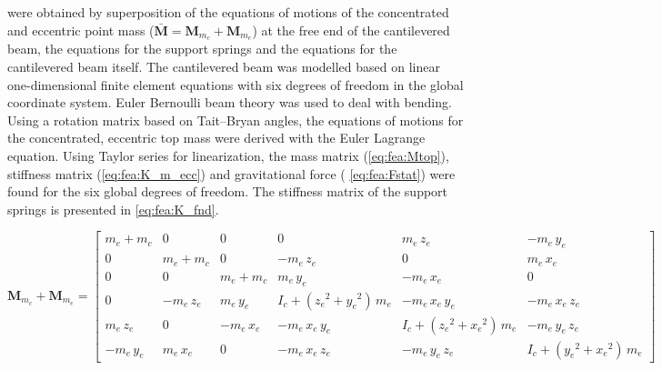 \documentclass{article}
\begin{document}
were obtained by superposition of the equations of motions of the concentrated and eccentric point mass ($ \mathbf{\bar{M}} = \mathbf{M}_{m_c} + \mathbf{M}_{m_e}$) at the free end of the cantilevered beam, the equations for the support springs and the equations for the cantilevered beam itself. The cantilevered beam was modelled based on linear one-dimensional finite element equations with six degrees of freedom in the global coordinate system. Euler Bernoulli beam theory was used to deal with bending. Using a rotation matrix based on Tait–Bryan angles, the equations of motions for the concentrated, eccentric top mass were derived with the Euler Lagrange equation. Using Taylor series for linearization, the  mass matrix (\autoref{eq:fea:Mtop}), stiffness matrix (\autoref{eq:fea:K_m_ecc}) and gravitational force ( \autoref{eq:fea:Fstat}) were found for the six global degrees of freedom. The stiffness matrix of the support springs is presented in \autoref{eq:fea:K_fnd}. 

\begin{small}
    \begin{equation}
        \mathbf{M}_{m_c} + \mathbf{M}_{m_e}  = 
        \begin{bmatrix}
         m_{e}+m_{c}   & 0             & 0             & 0                                             & m_{e}\,z_{e}                                  & -m_{e}\,y_{e}        \\ 
         0             & m_{e}+m_{c}   & 0             & -m_{e}\,z_{e}                                 & 0                                             & m_{e}\,x_{e}         \\ 
         0             & 0              & m_{e}+m_{c}   & m_{e}\,y_{e}                                  & -m_{e}\,x_{e}                                 & 0                    \\ 
         0             & -m_{e}\,z_{e} & m_{e}\,y_{e}  & I_{c}+\left({z_{e}}^2+{y_{e}}^2\right)\,m_{e} & -m_{e}\,x_{e}\,y_{e}                          & -m_{e}\,x_{e}\,z_{e} \\ 
         m_{e}\,z_{e}  & 0             & -m_{e}\,x_{e} & -m_{e}\,x_{e}\,y_{e}                          & I_{c}+\left({z_{e}}^2+{x_{e}}^2\right)\,m_{e} & -m_{e}\,y_{e}\,z_{e} \\
         -m_{e}\,y_{e} & m_{e}\,x_{e}  & 0             & -m_{e}\,x_{e}\,z_{e}                          & -m_{e}\,y_{e}\,z_{e}                          & I_{c}+\left({y_{e}}^2+{x_{e}}^2\right)\,m_{e} 
        \end{bmatrix}
        \label{eq:fea:Mtop}
    \end{equation}
\end{small}
\end{document}
